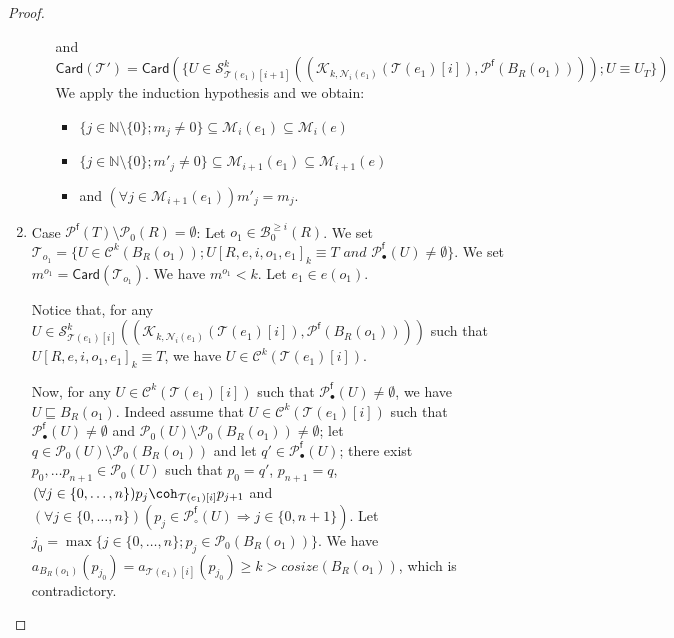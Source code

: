\documentclass{article}
\theoremstyle{plain}
\newcommand{\Nat}{\ensuremath{\mathbb{N}}}
\newcommand{\nontrivialconnected}[3]{\mathcal{S}_{#1}^{#3}(#2)}
\newcommand{\connectedcomponents}[2]{\mathcal{C}^{#2}(#1)}
\newcommand{\taylor}[2]{\mathcal{T}(#1)[#2]}
\newcommand{\criticalports}[3]{\mathcal{K}_{#2, #3}(#1)}
\newcommand{\cosize}[1]{\textit{cosize}(#1)}
\newcommand{\portsatzero}[1]{\mathcal{P}_0(#1)}
\newcommand{\arity}[1]{{\textit{a}}_{#1}}
\newcommand{\conclusions}[1]{\mathcal{P}^{\textsf{f}}(#1)}
\newcommand{\Card}[1]{\textsf{Card}\left( #1 \right)}
\newcommand{\conclusionscirc}[1]{\mathcal{P}_\circ^{\textsf{f}}(#1)}
\newcommand{\conclusionsnotcirc}[1]{\mathcal{P}_\bullet^{\textsf{f}}(#1)}
\newcommand{\boxesatzerogeq}[2]{\mathcal{B}_0^{\geq #2}(#1)}
\begin{document}
\begin{proof}
\begin{enumerate}
\begin{itemize}
and
$$\Card{\mathcal{T'}} = \Card{\{ U \in \nontrivialconnected{\taylor{e_1}{i+1}}{(\criticalports{\taylor{e_1}{i}}{k}{\mathcal{N}_i(e_1)},  \conclusions{B_R(o_1) })}{k} ; U \equiv U_T \}}$$
We apply the induction hypothesis and we obtain:
\begin{itemize}
\item $\{ j \in \Nat \setminus \{ 0 \} ; m_j \not= 0 \} \subseteq \mathcal{M}_i(e_1) \subseteq \mathcal{M}_i(e)$
\item $\{ j \in \Nat \setminus \{ 0 \} ; m'_j \not= 0 \} \subseteq \mathcal{M}_{i+1}(e_1) \subseteq \mathcal{M}_{i+1}(e)$
\item and $(\forall j \in \mathcal{M}_{i+1}(e_1)) m'_j = m_j$.
\end{itemize}
\end{itemize}
\item Case $\conclusions{T} \setminus \portsatzero{R} = \emptyset$: Let $o_1 \in \boxesatzerogeq{R}{i}$. We set $\mathcal{T}_{o_1} = \{ U \in \connectedcomponents{B_R(o_1)}{k} ; U[R, e, i, o_1, e_1]_k \equiv T \textit{ and } \conclusionsnotcirc{U} \not= \emptyset \}$. We set $m^{o_1} = \Card{\mathcal{T}_{o_1}}$. We have $m^{o_1} < k$. Let $e_1 \in e(o_1)$. 

Notice that, for any $U \in \nontrivialconnected{\taylor{e_1}{i}}{(\criticalports{\taylor{e_1}{i}}{k}{\mathcal{N}_i(e_1)},  \conclusions{B_R(o_1) })}{k}$ such that $U[R, e, i, o_1, e_1]_k \equiv T$, we have $U \in \connectedcomponents{\taylor{e_1}{i}}{k}$.

Now, for any  $U \in \connectedcomponents{\taylor{e_1}{i}}{k}$ such that $\conclusionsnotcirc{U} \not= \emptyset$, we have $U \sqsubseteq B_R(o_1)$. Indeed assume that $U \in \connectedcomponents{\taylor{e_1}{i}}{k}$ such that $\conclusionsnotcirc{U} \not= \emptyset$ and $\portsatzero{U} \setminus \portsatzero{B_R(o_1)} \not= \emptyset$; let $q \in \portsatzero{U} \setminus \portsatzero{B_R(o_1)}$ and let $q' \in \conclusionsnotcirc{U}$; there exist $p_0, \ldots p_{n+1} \in \portsatzero{U}$ such that $p_0 = q'$, $p_{n+1} = q$, $(\forall j \in \{ 0, \ldots, n \}) p_j \coh_{\taylor{e_1}{i}} p_{j+1}$ and $(\forall j \in \{ 0, \ldots, n \}) (p_j \in \conclusionscirc{U} \Rightarrow j \in \{ 0, n+1 \})$. Let $j_0 = \max \{ j \in \{ 0, \ldots, n \} ; p_j \in \portsatzero{B_R(o_1)} \}$. We have $\arity{B_R(o_1)}(p_{j_0}) = \arity{\taylor{e_1}{i}}(p_{j_0}) \geq k > \cosize{B_R(o_1)}$, which is contradictory.




\end{enumerate}
\end{proof}
\end{document}
